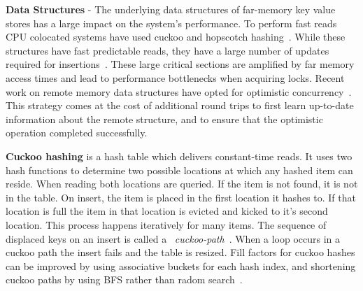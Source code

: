 \textbf{Data Structures} - The underlying data structures of
far-memory key value stores has a large impact on the
system's performance. To perform fast reads CPU colocated
systems have used cuckoo and hopscotch
hashing~\cite{pilaf,herd,cuckoo,hopscotch}. While these
structures have fast predictable reads, they have a large
number of updates required for
insertions~\cite{pilaf,cuckoo-improvements,memc3}. These
large critical sections are amplified by far memory access
times and lead to performance bottlenecks when acquiring
locks. Recent work on remote memory data structures have
opted for optimistic concurrency~\cite{clover,race,ford}.
This strategy comes at the cost of additional round trips to
first learn up-to-date information about the remote
structure, and to ensure that the optimistic operation
completed successfully.

\textbf{Cuckoo hashing} is a hash table which delivers constant-time reads. It uses two hash functions to determine two
possible locations at which any hashed item can reside. When
reading both locations are queried. If the item is not
found, it is not in the table. On insert, the item is placed
in the first location it hashes to. If that location is full
the item in that location is evicted and kicked to it's
second location.  This process happens iteratively for many
items. The sequence of displaced keys on an insert is called
a ~\textit{cuckoo-path}~\cite{cuckoo-improvements}. When a
loop occurs in a cuckoo path the insert fails and the table
is resized. Fill factors for cuckoo hashes can be improved
by using associative buckets for each hash index, and
shortening cuckoo paths by using BFS rather than radom
search~\cite{cuckoo-improvements}.